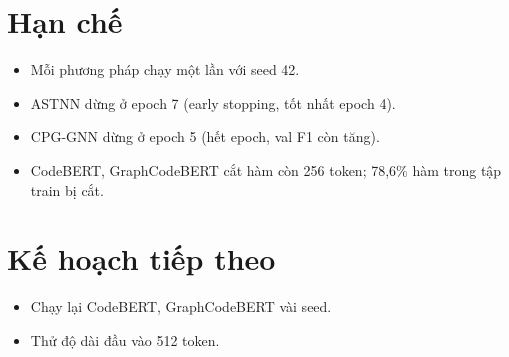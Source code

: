 \documentclass[11pt,a4paper]{article}
\begin{document}
\section{Hạn chế}

\begin{itemize}
\item Mỗi phương pháp chạy một lần với seed 42.
\item ASTNN dừng ở epoch 7 (early stopping, tốt nhất epoch 4).
\item CPG-GNN dừng ở epoch 5 (hết epoch, val F1 còn tăng).
\item CodeBERT, GraphCodeBERT cắt hàm còn 256 token; 78,6\% hàm trong tập train bị
      cắt.
\end{itemize}

\section{Kế hoạch tiếp theo}

\begin{itemize}
\item Chạy lại CodeBERT, GraphCodeBERT vài seed.
\item Thử độ dài đầu vào 512 token.
\end{itemize}
\end{document}
